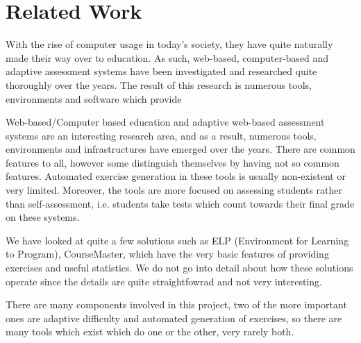\chapter{Related Work}
\label{chap:related-work}




With the rise of computer usage in today's society, they have quite naturally made their way over to education. As such, web-based, computer-based and adaptive assessment systems have been investigated and researched quite thoroughly over the years. The result of this research is numerous tools, environments and software which provide 

Web-based/Computer based education and adaptive web-based assessment systems are an interesting research area, and as a result, numerous tools, environments and infrastructures have emerged over the years. There are common features to all, however some distinguish themselves by having not so common features.
Automated exercise generation in these tools is usually non-existent or very limited. Moreover, the tools are more focused on assessing students rather than self-assessment, i.e. students take tests which count towards their final grade on these systems.\newline

We have looked at quite a few solutions such as ELP (Environment for Learning to Program), CourseMaster, which have the very basic features of providing exercises and useful statistics. We do not go into detail about how these solutions operate since the details are quite straightfowrad and not very interesting.\newline

There are many components involved in this project, two of the more important ones are adaptive difficulty and automated generation of exercises, so there are many tools which exist which do one or the other, very rarely both.\newline

